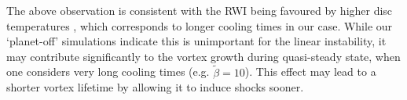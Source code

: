 The above observation is consistent with the RWI being favoured by higher
disc temperatures \citep{li00,lin12c}, which corresponds to longer
cooling times in our case. While our `planet-off' simulations indicate
this is unimportant for the linear instability, it may contribute 
significantly to the vortex growth during quasi-steady state, when one
considers very long cooling times (e.g. $\tilde{\beta}=10$). This
effect may lead to a shorter vortex lifetime by allowing it to
induce shocks sooner. 

%
